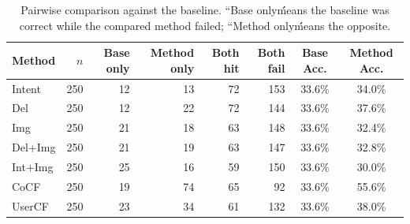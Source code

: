 \begin{table}[t]
\centering
\small
\caption{Pairwise comparison against the baseline. ``Base only\'\' means the baseline was correct while the compared method failed; ``Method only\'\' means the opposite.}
\label{tab:pairwise-baseline}
\begin{tabular}{l r r r r r c c}
\toprule
Method & $n$ & Base only & Method only & Both hit & Both fail & Base Acc. & Method Acc. \\
\midrule
Intent & 250 & 12 & 13 & 72 & 153 & 33.6\% & 34.0\% \\
Del & 250 & 12 & 22 & 72 & 144 & 33.6\% & 37.6\% \\
Img & 250 & 21 & 18 & 63 & 148 & 33.6\% & 32.4\% \\
Del+Img & 250 & 21 & 19 & 63 & 147 & 33.6\% & 32.8\% \\
Int+Img & 250 & 25 & 16 & 59 & 150 & 33.6\% & 30.0\% \\
CoCF & 250 & 19 & 74 & 65 & 92 & 33.6\% & 55.6\% \\
UserCF & 250 & 23 & 34 & 61 & 132 & 33.6\% & 38.0\% \\
\bottomrule
\end{tabular}
\end{table}